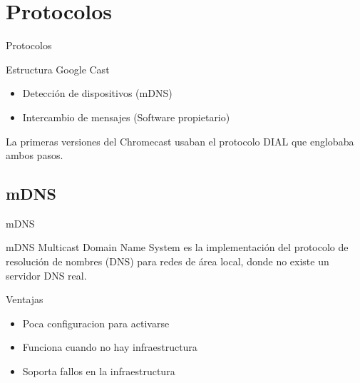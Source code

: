 \section{Protocolos}

\begin{frame}{Protocolos}
	\begin{block}{Estructura Google Cast}
		\begin{itemize}
			\item Detección de dispositivos (mDNS)
			\item Intercambio de mensajes (Software propietario)
		\end{itemize}
	\end{block}
	
	\begin{block}{ }
		La primeras versiones del Chromecast usaban el protocolo DIAL que englobaba ambos pasos.		
	\end{block}
\end{frame}



\subsection{mDNS}

\begin{frame}{mDNS}
	\begin{block}{mDNS}
		Multicast Domain Name System es la implementación del protocolo de resolución de nombres (DNS) para redes de área local, donde no existe un servidor DNS real.		
	\end{block}
	
	\begin{block}{Ventajas}
		\begin{itemize}
			\item Poca configuracion para activarse
			\item Funciona cuando no hay infraestructura
			\item Soporta fallos en la infraestructura
		\end{itemize}
	\end{block}
\end{frame}


